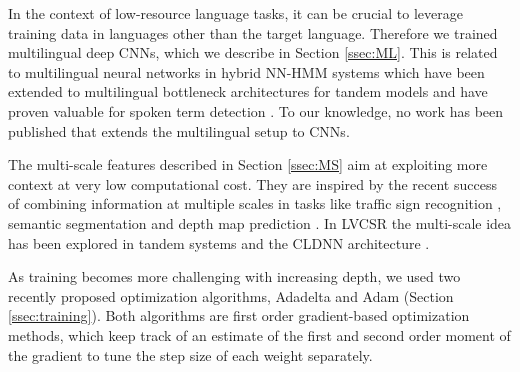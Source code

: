 \documentclass{article}
\begin{document}
In the context of low-resource language tasks, it can be crucial to leverage 
training data in languages other than the target language.
Therefore we trained multilingual deep CNNs, which we describe in Section \ref{ssec:ML}.
This is related to
multilingual neural networks in hybrid NN-HMM systems \cite{scanzio2008use}
which have been extended to multilingual bottleneck architectures for 
tandem models \cite{thomas2012multilingual, tuske2013investigation}
and have proven valuable for spoken term detection \cite{knill2013investigation}.
To our knowledge, no work has been published that extends the multilingual setup to CNNs.

The multi-scale features described in Section \ref{ssec:MS} aim at exploiting
more context at very low computational cost.
They are inspired by the recent success of combining information at multiple scales in tasks like 
traffic sign recognition \cite{sermanet2011traffic},
semantic segmentation \cite{farabet2013learning, long2014fully} and 
depth map prediction \cite{eigen2014depth}.
In LVCSR the multi-scale idea has been explored in tandem systems \cite{grezl2009investigation}
and the CLDNN architecture \cite{sainathconvolutional}.

\begin{table}[ht]
\centering

\caption{\label{tab:deep}The configurations of our very deep CNNs for LVCSR. In all but the classic convnet,
    convolutional layers have 3$\times$3 kernels, thus kernel size is omitted. 
    The depth of the networks increases from left to right. 
    The deepest configuration, WDX, has 10 convolutional and 4 fully connected layers.
    The leftmost column indicates the number of output feature maps in each layer.
    The optional X means there are four fully connected layers instead of three (output layer included).
     }
\end{table}
As training becomes more challenging with increasing depth,
we used two recently proposed optimization algorithms, Adadelta \cite{zeiler2012adadelta} and Adam \cite{kingma2014adam}
(Section \ref{ssec:training}).
Both algorithms are first order gradient-based optimization methods, which keep track of an estimate of
the first and second order moment of the gradient to tune the step size of each weight separately.
\end{document}

